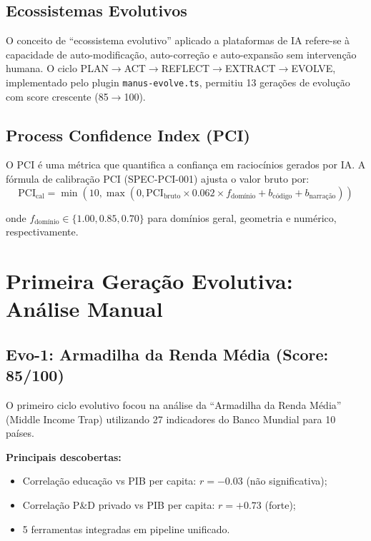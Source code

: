 \documentclass[12pt,a4paper,sumario=tradicional]{abntex2}
\begin{document}
\section{Ecossistemas Evolutivos}

O conceito de ``ecossistema evolutivo'' aplicado a plataformas de IA refere-se à capacidade de auto-modificação, auto-correção e auto-expansão sem intervenção humana. O ciclo PLAN$\rightarrow$ACT$\rightarrow$REFLECT$\rightarrow$EXTRACT$\rightarrow$EVOLVE, implementado pelo plugin \texttt{manus-evolve.ts}, permitiu 13 gerações de evolução com score crescente (85$\to$100).

\section{Process Confidence Index (PCI)}

O PCI é uma métrica que quantifica a confiança em raciocínios gerados por IA. A fórmula de calibração PCI (SPEC-PCI-001) ajusta o valor bruto por:
\begin{equation}
    \text{PCI}_{\text{cal}} = \min\left(10, \max\left(0, \text{PCI}_{\text{bruto}} \times 0.062 \times f_{\text{domínio}} + b_{\text{código}} + b_{\text{narração}}\right)\right)
\end{equation}

onde $f_{\text{domínio}} \in \{1.00, 0.85, 0.70\}$ para domínios geral, geometria e numérico, respectivamente.

\chapter{Primeira Geração Evolutiva: Análise Manual}

\section{Evo-1: Armadilha da Renda Média (Score: 85/100)}

O primeiro ciclo evolutivo focou na análise da ``Armadilha da Renda Média'' (Middle Income Trap) utilizando 27 indicadores do Banco Mundial para 10 países.

\textbf{Principais descobertas:}
\begin{itemize}
    \item Correlação educação vs PIB per capita: $r = -0.03$ (não significativa);
    \item Correlação P\&D privado vs PIB per capita: $r = +0.73$ (forte);
    \item 5 ferramentas integradas em pipeline unificado.
\end{itemize}
\end{document}
